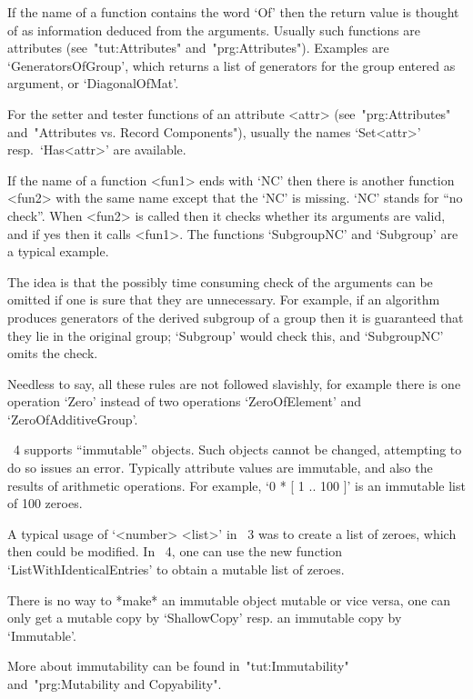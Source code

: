 If the name of a function contains the word `Of' then the return value is
thought of as information deduced from the arguments.
Usually such functions are attributes
(see~"tut:Attributes" and~"prg:Attributes").
Examples are `GeneratorsOfGroup', which returns a list of generators for
the group entered as argument, or `DiagonalOfMat'.

For the setter and tester functions of an attribute <attr>
(see~"prg:Attributes" and~"Attributes vs. Record Components"),
usually the names `Set<attr>' resp.~`Has<attr>' are available.

If the name of a function <fun1> ends with `NC' then there is another
function <fun2> with the same name except that the `NC' is missing.
`NC' stands for ``no check''.
When <fun2> is called then it checks whether its arguments are valid,
and if yes then it calls <fun1>.
The functions `SubgroupNC' and `Subgroup' are a typical example.

The idea is that the possibly time consuming check of the arguments
can be omitted if one is sure that they are unnecessary.
For example, if an algorithm produces generators of the derived subgroup
of a group then it is guaranteed that they lie in the original group;
`Subgroup' would check this, and `SubgroupNC' omits the check.

Needless to say, all these rules are not followed slavishly,
for example there is one operation `Zero' instead of two operations
`ZeroOfElement' and `ZeroOfAdditiveGroup'.



{\GAP}~4 supports ``immutable'' objects.
Such objects cannot be changed, attempting to do so issues an error.
Typically attribute values are immutable,
and also the results of arithmetic operations.
For example, `0 * [ 1 .. 100 ]' is an immutable list of 100 zeroes.

A typical usage of `<number> \* <list>' in {\GAP}~3 was to create a list
of zeroes, which then could be modified.
In {\GAP}~4, one can use the new function `ListWithIdenticalEntries' to
obtain a mutable list of zeroes.

There is no way to *make* an immutable object mutable or vice versa,
one can only get a mutable copy by `ShallowCopy' resp. an immutable copy
by `Immutable'.

More about immutability can be found in~"tut:Immutability"
and~"prg:Mutability and Copyability".


